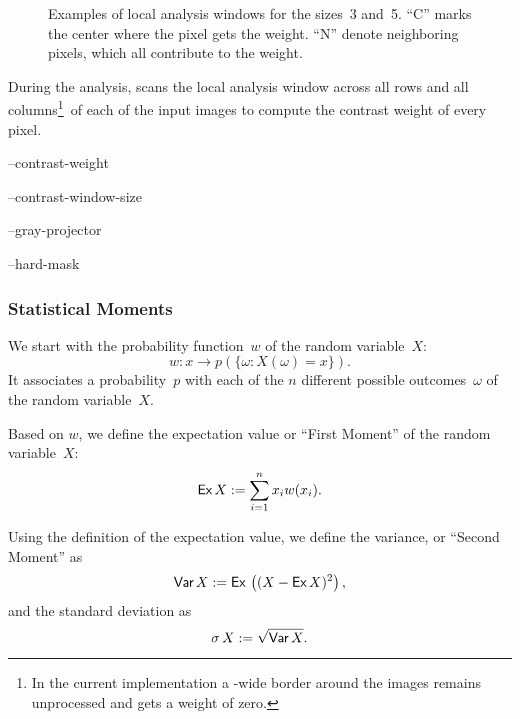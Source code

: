 \begin{figure}[htbp]
  \begin{maxipage}
    \centering
  \end{maxipage}

  \caption[Local analysis window]{\label{fig:local-analysis-window}Examples of local analysis
    windows for the sizes~3 and~5.  ``\textsf{C}'' marks the center where the pixel gets the
    weight.  ``\textsf{N}'' denote neighboring pixels, which all contribute to the weight.}
\end{figure}


During the analysis, \App{} scans the local analysis window across all rows and all
columns\footnote{In the current implementation a -wide
  border around the images remains unprocessed and gets a weight of zero.}\ of each of the input
images to compute the contrast weight of every pixel.

\begin{optionsummary}
\item[--contrast-weight] \sectionName~
\item[--contrast-window-size] \sectionName~
\item[--gray-projector] \sectionName~
\item[--hard-mask] \sectionName~
\end{optionsummary}


\subsubsection[Statistical Moments]{\label{sec:statistical-moments}%
  Statistical Moments}

%
%
We start with the probability function~$w$ of the random variable~$X$:
\[
    w: x \rightarrow p(\{\omega: X(\omega) = x\}).
\]
\noindent It associates a probability~$p$ with each of the $n$ different possible
outcomes~$\omega$ of the random variable~$X$.

%
%
%
Based on $w$, we define the expectation value or ``First Moment'' of the random variable~$X$:
\[
    \textsf{Ex}\, X := \sum_{i = 1}^n x_i w(x_i).
\]

%
%
%
Using the definition of the expectation value, we define the
variance, or ``Second Moment'' as
\[
    \textsf{Var}\, X := \mbox{\textsf{Ex}\,}\left( (X - \textsf{Ex}\, X)^2 \right),
\]
%
\noindent and the standard deviation as
\[
    \sigma \, X := \sqrt{\textsf{Var}\, X}.
\]

